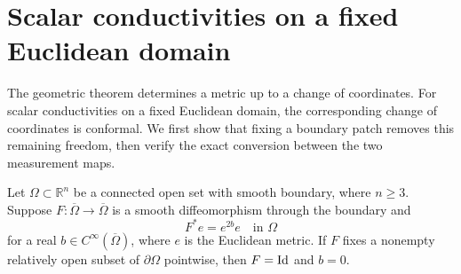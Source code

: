 \section{Scalar conductivities on a fixed Euclidean domain}
\label{scalar:section}

The geometric theorem determines a metric up to a change of coordinates.
For scalar conductivities on a fixed Euclidean domain, the corresponding
change of coordinates is conformal.  We first show that fixing a boundary
patch removes this remaining freedom, then verify the exact conversion
between the two measurement maps.

\begin{lemma}
\label{scalar:boundary-rigidity}
Let $\Omega\subset\mathbb R^n$ be a connected open set with smooth
boundary, where $n\ge3$.  Suppose $F:\overline\Omega\to\overline\Omega$
is a smooth diffeomorphism through the boundary and
\[
 F^*e=e^{2b}e\quad\text{in }\Omega
\]
for a real $b\in C^\infty(\overline\Omega)$, where $e$ is the
Euclidean metric.  If $F$ fixes a nonempty relatively open subset of
$\partial\Omega$ pointwise, then $F=\mathrm{Id}$ and $b=0$.
\end{lemma}

